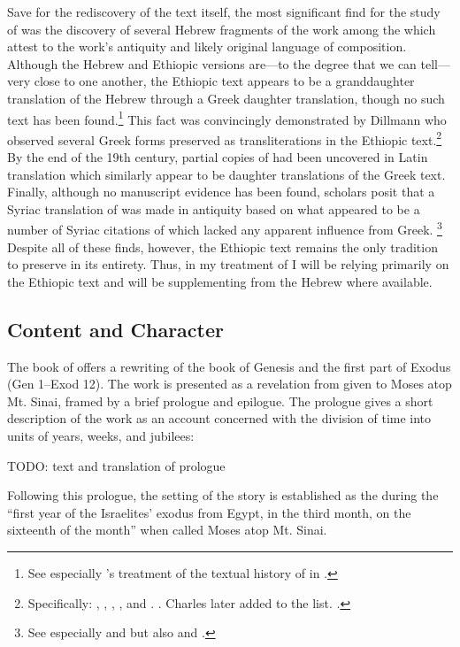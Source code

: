 Save for the rediscovery of the text itself, the most significant find for the study of \jub was the discovery of several Hebrew fragments of the work among the \dss which attest to the work's antiquity and likely original language of composition. Although the Hebrew and Ethiopic versions are---to the degree that we can tell---very close to one another, the Ethiopic text appears to be a granddaughter translation of the Hebrew through a Greek daughter translation, though no such text has been found.\footnote{See especially \vanderkam's treatment of the textual history of \jub in \cite*[1--18]{vanderkam1977}.} This fact was convincingly demonstrated by Dillmann who observed several Greek forms preserved as transliterations in the Ethiopic text.\footnote{Specifically: , , , , and . \cite[88]{dillamnn_jbw1850}. Charles later added  to the list. \cite[xxx]{charles1902}.} By the end of the 19th century, partial copies of \jub had been uncovered in Latin translation which similarly appear to be daughter translations of the Greek text. Finally, although no manuscript evidence has been found, \jub scholars posit that a Syriac translation of \jub was made in antiquity based on what appeared to be a number of Syriac citations of \jub which lacked any apparent influence from Greek.%
%
\footnote{%
See especially \cite[231--232]{tisserant_rb1921} and \cite[xxix]{charles1902} but also \cite[2:ix--x]{ceriani1861} and \cite[x]{charles1895}.}
%
Despite all of these finds, however, the Ethiopic text remains the only tradition to preserve \jub in its entirety. Thus, in my treatment of \jub I will be relying primarily on the Ethiopic text and will be supplementing from the Hebrew where available.

\subsection{Content and Character}
The book of \jub offers a rewriting of the book of Genesis and the first part of Exodus (Gen 1--Exod 12). The work is presented as a revelation from \yahweh given to Moses atop Mt. Sinai, framed by a brief prologue and epilogue.\autocite[1:17]{vanderkam2018} The prologue gives a short description of the work as an account concerned with the division of time into units of years, weeks, and jubilees:

    TODO: text and translation of prologue

Following this prologue, the setting of the story is established as the during the ``first year of the Israelites' exodus from Egypt, in the third month, on the sixteenth of the month'' when \yahweh called Moses atop Mt. Sinai.

